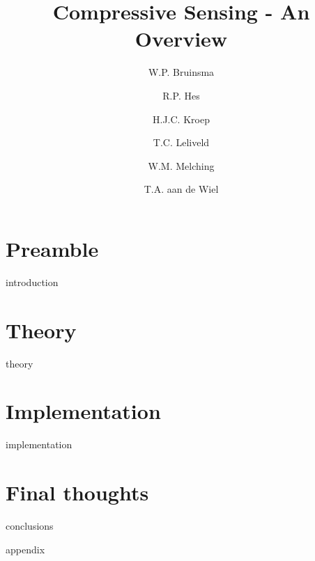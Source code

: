 \documentclass[a4paper, openany, oneside]{memoir}
\title{Compressive Sensing - An Overview}
\author{W.P. Bruinsma \and R.P. Hes \and H.J.C. Kroep \and T.C. Leliveld \and W.M. Melching \and T.A. aan de Wiel}
\begin{document}
\frontmatter

\begin{titlingpage}
  \pagestyle{empty}
  \maketitle
\end{titlingpage}


\tableofcontents

\mainmatter
\part{Preamble}
{introduction}
\part{Theory}
{theory}
\part{Implementation}
{implementation}
\part{Final thoughts}
{conclusions}

\backmatter
{}
\printbibliography

\appendix
{appendix}
\end{document}
